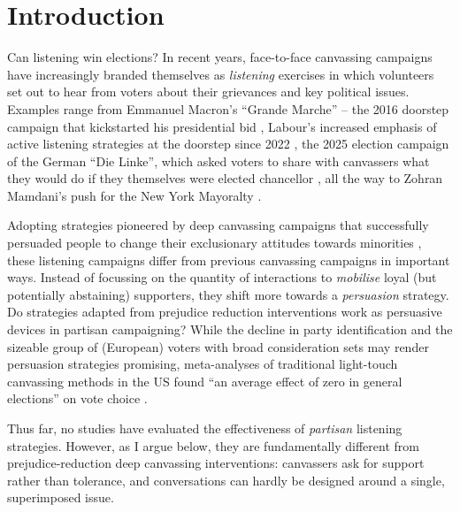 \documentclass[11pt,a4paper]{scrartcl}
\begin{document}
\vspace{4cm}

\newpage

\tableofcontents

\newpage

\section{Introduction}

Can listening win elections? In recent years, face-to-face canvassing campaigns have increasingly branded themselves as \emph{listening} exercises in which volunteers set out to hear from voters about their grievances and key political issues. Examples range from Emmanuel Macron's \enquote{Grande Marche} -- the 2016 doorstep campaign that kickstarted his presidential bid \autocite{schultheisCanFrenchPolitical2017}, Labour's increased emphasis of active listening strategies at the doorstep since 2022 \autocite{avrilPersuasionPathwaysHero2025}, the 2025 election campaign of the German \enquote{Die Linke}, which asked voters to share with canvassers what they would do if they themselves were elected chancellor \autocite{HausturwahlkampfWieLinke2025}, all the way to Zohran Mamdani's push for the New York Mayoralty \autocite{pilkingtonNewYorkersHave2025}.

Adopting strategies pioneered by deep canvassing campaigns that successfully persuaded people to change their exclusionary attitudes towards minorities \autocites{broockmanDurablyReducingTransphobia2016}{kallaReducingExclusionaryAttitudes2020}{kallaWhichNarrativeStrategies2023}, these listening campaigns differ from previous canvassing campaigns in important ways. Instead of focussing on the quantity of interactions to \emph{mobilise} loyal (but potentially abstaining) supporters, they shift more towards a \emph{persuasion} strategy. Do strategies adapted from prejudice reduction interventions work as persuasive devices in partisan campaigning? While the decline in party identification \autocite{garziaPartisanDealignmentPersonalisation2022} and the sizeable group of (European) voters with broad consideration sets \autocite{wagnerMicroPerspectivePolitical2017} may render persuasion strategies promising, meta-analyses of traditional light-touch canvassing methods in the US found \enquote{an average effect of zero in general elections} on vote choice \autocite{kallaMinimalPersuasiveEffects2018}.

Thus far, no studies have evaluated the effectiveness of \emph{partisan} listening strategies. However, as I argue below, they are fundamentally different from prejudice-reduction deep canvassing interventions: canvassers ask for support rather than tolerance, and conversations can hardly be designed around a single, superimposed issue.
\end{document}
